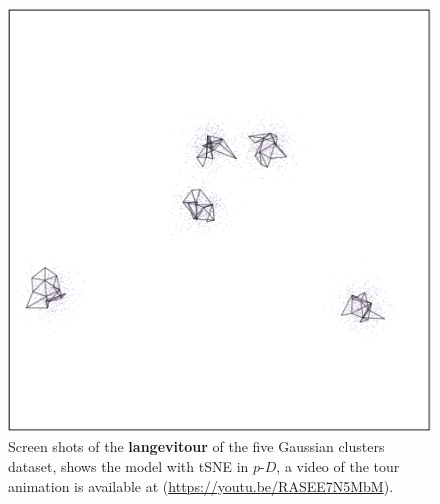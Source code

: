\documentclass[
  12pt]{article}
\newcommand\pD{$p\text{-}D$}
\begin{document}
\begin{figure}[H]
%
\begin{minipage}{0.33\linewidth}
\includegraphics{figures/five_gau_clusters/sc_tsne_3.png}\end{minipage}%

\caption{\label{fig-gau1_sc}Screen shots of the \textbf{langevitour} of
the five Gaussian clusters dataset, shows the model with tSNE in \pD{},
a video of the tour animation is available at
(\url{https://youtu.be/RASEE7N5MbM}).}

\end{figure}%
\end{document}
